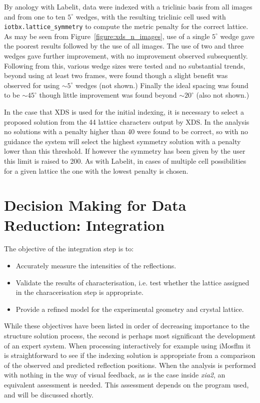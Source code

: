 \documentclass[preprint,pdf]{iucr}
\begin{document}
By anology with Labelit, data were indexed with a triclinic basis
from all images and from one to ten $5^{\circ}$ wedges, with the
resulting triclinic cell used with \verb|iotbx.lattice_symmetry| to
compute the metric penalty for the correct lattice. As may be seen
from Figure~\ref{figure:xds_n_images},
use of a single $5^{\circ}$ wedge gave the poorest
results followed by the use of all images. The use of two and three
wedges gave further improvement, with no improvement observed
subsequently. Following from this, various wedge sizes were tested and
no substantial trends, beyond using at least two frames, were found
though a slight benefit was observed for using $\sim 5^{\circ}$ wedges
(not shown.) Finally the ideal spacing was found to be $\sim
45^{\circ}$ though little improvement was found beyond $\sim
20^{\circ}$ (also not shown.)  

In the case that XDS is used for the initial indexing, it is necessary
to select a proposed solution from the 44 lattice characters output by
XDS. In the analysis no solutions with a penalty higher than 40 were
found to be correct, so with no guidance the system will select the
highest symmetry solution with a penalty lower than this threshold. If
however the symmetry has been given by the user this limit is raised
to 200. As with Labelit, in cases of multiple cell possibilities for a
given lattice the one with the lowest penalty is chosen.


\section{Decision Making for Data Reduction: Integration}

The objective of the integration step is to:

\begin{itemize}
\item{Accurately measure the intensities of the reflections.}
\item{Validate the results of characterisation, i.e. test whether the
    lattice assigned in the characerisation step is appropriate.}
\item{Provide a refined model for the experimental geometry and
    crystal lattice.}
\end{itemize}

\noindent
While these objectives have been listed in order of decreasing
importance to the structure solution process, the second is perhaps
most significant the development of an expert system. When processing
interactively for example using iMosflm it is
straightforward to see if the indexing solution is appropriate from a
comparison of the observed and predicted reflection positions. When
the analysis is performed with nothing in the way of visual feedback,
as is the case inside \emph{xia2}, an equivalent assessment is
needed. This assessment depends on the program used, and will be
discussed shortly.
\end{document}
